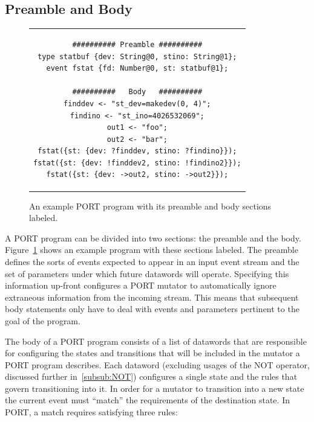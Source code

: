%
%


\subsection{Preamble and Body}
\label{sub:PreambleAndBody}

\begin{figure}[h]
\centering
\begin{tabular}{c}
\begin{lstlisting}
########## Preamble ##########
type statbuf {dev: String@0, stino: String@1};
event fstat {fd: Number@0, st: statbuf@1};

##########   Body   ##########
finddev <- "st_dev=makedev(0, 4)";
findino <- "st_ino=4026532069";
out1 <- "foo";
out2 <- "bar";
fstat({st: {dev: ?finddev, stino: ?findino}});
fstat({st: {dev: !finddev2, stino: !findino2}});
fstat({st: {dev: ->out2, stino: ->out2}});
\end{lstlisting}
\end{tabular}
\caption{An example PORT program with its preamble and body sections
  labeled.}
\label{lst:PreambleBody}
\end{figure}



A PORT program can be divided into two sections: the preamble and the body.
Figure~\ref{lst:PreambleBody} shows an example program with these sections
labeled.
The preamble defines the sorts of events
expected
to appear in an input event stream and the set of parameters
under which future datawords will operate.  Specifying this information
up-front configures a PORT mutator to
automatically ignore extraneous information from the incoming stream.  This
means that subsequent body statements only have to deal with events and
parameters pertinent to the goal of the program.

The body of a PORT program consists of a list of datawords that
are responsible for configuring the states and transitions
that will be included in the mutator a PORT program describes.
Each dataword (excluding usages of the NOT operator, discussed further
in~\ref{subsub:NOT}) configures a single
state and the rules that govern transitioning into it.
In order for a mutator to transition into a new state
the current event must ``match'' the requirements of the destination state.
In PORT, a match requires satisfying three rules:

